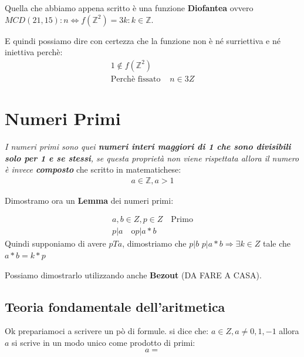 \documentclass{article}
\begin{document}
Quella che abbiamo appena scritto è una funzione \textbf{Diofantea} ovvero $MCD(21,15) : n \Leftrightarrow f(\mathbb{Z}^{2})={3k : k \in \mathbb{Z}}$. \par

E quindi possiamo dire con certezza che la funzione non è né surriettiva e né iniettiva perchè:
\begin{align*}
        1 \notin f(\mathbb{Z}^{2}) \\
        \textrm{Perchè fissato } & n \in 3Z
\end{align*}









\newpage
\section{Numeri Primi}
\textit{I numeri primi sono quei \textbf{numeri interi maggiori di 1 che sono divisibili solo per 1 e se stessi}, se questa proprietà non viene rispettata allora il numero è invece \textbf{composto}} che scritto in matematichese:
\begin{align}
       a \in \mathbb{Z}, a>1
\end{align}

Dimostramo ora un \textbf{Lemma} dei numeri primi:

\begin{align}
        a,b \in Z, p \in Z \quad \textrm{Primo} \\
        p | a \quad \textrm{o} p | a*b
\end{align}
Quindi supponiamo di avere $p T a$, dimostriamo che $p|b$
$p | a*b \Rightarrow \exists k \in Z$ tale che $a*b = k*p$

Possiamo dimostrarlo utilizzando anche \textbf{Bezout} (DA FARE A CASA).



\subsection{Teoria fondamentale dell'aritmetica}
Ok prepariamoci a scrivere un pò di formule. \newline
si dice che: $a \in Z, a \not = 0,1,-1$ allora $a$ si scrive in un modo unico come prodotto di primi:
\begin{equation}
a =
\end{equation}
\end{document}

